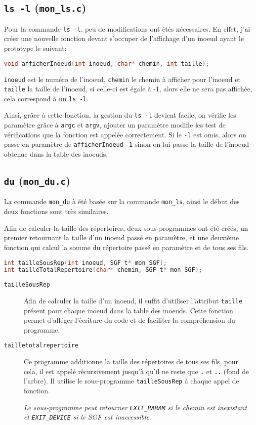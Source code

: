 \documentclass[a4paper, 11pt]{article}
\begin{document}
	\subsection{\texttt{ls -l} (\texttt{mon\_ls.c})}
	Pour la commande \texttt{ls -l}, peu de modifications ont étés nécessaires. En effet, j'ai créer une nouvelle fonction devant s'occuper de l'affichage
	d'un inoeud ayant le prototype le suivant:  
	\begin{lstlisting}[language=C, numbers=none, basicstyle=\ttfamily, caption=Prototype de \texttt{afficherInoeud}]
void afficherInoeud(int inoeud, char* chemin, int taille);
	\end{lstlisting}
	\texttt{inoeud} est le numéro de l'inoeud, \texttt{chemin} le chemin à afficher pour l'inoeud et \texttt{taille} la taille de l'inoeud, si celle-ci est égale
	à -1, alors elle ne sera pas affichée, cela correspond à un \texttt{ls -l}.

	Ainsi, grâce à cette fonction, la gestion du \texttt{ls -l} devient facile, on vérifie les paramètre grâce à \texttt{argc} et \texttt{argv}, ajouter un
	paramètre modifie les test de vérifications que la fonction est appelée correctement. Si le \texttt{-l} est omis, alors on passe en paramètre de
	\texttt{afficherInoeud} \texttt{-1} sinon on lui passe la taille de l'inoeud obtenue dans la table des inoeuds. 
	\subsection{\texttt{du} (\texttt{mon\_du.c})}
	La commande \texttt{mon\_du} à été basée sur la commande \texttt{mon\_ls}, ainsi le début des deux fonctions sont très similaires.

	Afin de calculer la taille des répertoires, deux sous-programmes ont été créés, un premier retournant la taille d'un inoeud passé en paramètre, et
	une deuxième fonction qui calcul la somme du répertoire passé en paramètre et de tous ses fils.
	\begin{lstlisting}[language=C, numbers=none, basicstyle=\ttfamily, caption=Prototype de \texttt{afficherInoeud}]
int tailleSousRep(int inoeud, SGF_t* mon_SGF);
int tailleTotalRepertoire(char* chemin, SGF_t* mon_SGF);
	\end{lstlisting}
	\begin{description}
		\item[\texttt{tailleSousRep}] 
			Afin de calculer la taille d'un inoeud, il suffit d'utiliser l'attribut \texttt{taille} présent pour chaque inoeud dans la table des inoeuds. Cette
			fonction permet d'alléger l'écriture du code et de faciliter la compréhension du programme.
		\item[\texttt{tailletotalrepertoire}]  Ce programme additionne la taille des répertoires de tous ses fils, pour cela, il est appelé récursivement
			jusqu'à qu'il ne reste que \texttt{.} et \texttt{..} (fond de l'arbre).  Il utilise le sous-programme \texttt{tailleSousRep} à chaque appel de
			fonction.

			\textit{Le sous-programme peut retourner \texttt{EXIT\_PARAM} si le chemin est inexistant et \texttt{EXIT\_DEVICE} si le SGF est inaccessible}
	\end{description}
\end{document}
